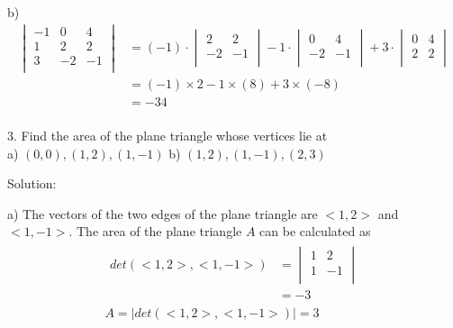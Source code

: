 \documentclass{article}
\begin{document}
b)
\begin{equation*}
\begin{split}
  \begin{vmatrix}
    -1 & 0 & 4 \\
    1 & 2 & 2 \\
    3 & -2 & -1 \\
  \end{vmatrix} 
  &= (-1) \cdot \begin{vmatrix}
                  2 & 2 \\
                  -2 & -1 \\ 
                \end{vmatrix} -
     1 \cdot \begin{vmatrix}
               0 & 4 \\
               -2 & -1 \\ 
             \end{vmatrix} +
     3 \cdot \begin{vmatrix}
               0 & 4 \\
               2 & 2 \\ 
             \end{vmatrix} \\ 
  &= (-1) \times 2 - 1 \times (8) + 3 \times (-8) \\
  &= -34 \\
\end{split}
\end{equation*}

3. Find the area of the plane triangle whose vertices lie at\\
a) $(0, 0), (1, 2), (1, -1)$ \hspace{10px} b) $(1, 2), (1, -1), (2, 3)$

Solution:

a) The vectors of the two edges of the plane triangle are $<1, 2>$ and 
$<1, -1>$. The area of the plane triangle $A$ can be calculated as
\begin{gather*}
  \begin{split}
    det(<1, 2>, <1, -1>) &= \begin{vmatrix}
                              1 & 2 \\
                              1 & -1 \\ 
                            \end{vmatrix} \\
                         &= -3
  \end{split} \\
  A = |det(<1, 2>, <1, -1>)| = 3 \\
\end{gather*}
\end{document}
